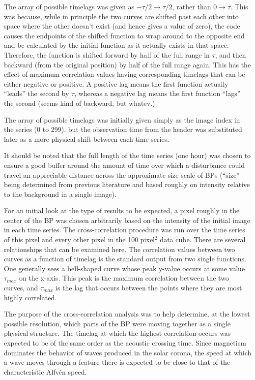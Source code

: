 \documentclass[preprint]{aastex}   %
\begin{document}
The array of possible timelags was given as
$-\tau/2 \rightarrow \tau/2$, rather than
$0 \rightarrow \tau$.
This was because, while in principle the two curves are shifted past each other into
space where the other doesn't exist (and hence gives a value of zero),
the code causes the endpoints of the shifted function to wrap around to the
opposite end and be calculated by the initial function as it actually exists
in that space. Therefore, the function is shifted forward by half of the full
range in $\tau$, and then backward (from the original position) by half of the full
range again. This has the effect of maximum correlation values having corresponding
timelags that can be either negative or positive. A positive lag means the first
function actually ``leads'' the second by $\tau$, whereas a negative lag means the
first function ``lags'' the second (seems kind of backward, but whatev.)

The array of possible timelags was initially given simply as the image index in
the series (0 to 299), but the observation time from the header was substituted
later as a more physical shift between each time series.

It should be noted that the full length of the time series (one hour) was chosen to
ensure a good buffer around the amount of time over which a disturbance could travel
an appreciable distance across the approximate size scale of BPs (``size'' being
determined from previous literature and based roughly on intensity relative to the
background in a single image).

For an initial look at the type of results to be expected, a pixel roughly in the center
of the BP was chosen arbitrarily based on
the intensity of the initial image in each time series. The cross-correlation procedure was
run over the time series of this pixel and every other pixel in the 100 pixel$^{2}$ data
cube. There are several relationships that can be examined here.
The correlation values between two curves as a function of timelag is the standard
output from two single functions. One generally sees a bell-shaped curve whose
peak y-value occurs at some value $\tau_{max}$ on the x-axis. This peak is the maximum
correlation between the two curves, and $\tau_{max}$ is the lag that occurs between the
points where they are most highly correlated.

The purpose of the cross-correlation analysis was to help
determine, at the lowest possible resolution, which parts of the BP were moving
together as a single physical structure. The timelag at which the highest correlation
occurs was expected to be of the same order as the acoustic crossing time.
Since
magnetism dominates the behavior of waves produced in the solar corona, the
speed at which a wave moves through a feature there is expected
to be close to that of the characteristic Alfv\'en speed.
\end{document}

